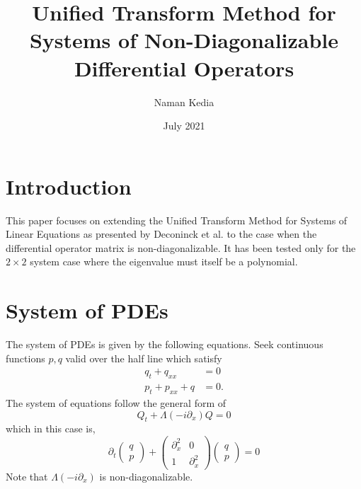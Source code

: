 \documentclass{article}
\title{Unified Transform Method for Systems of Non-Diagonalizable Differential Operators}
\author{Naman Kedia }
\date{July 2021}
\begin{document}
\maketitle

\section{Introduction}
This paper focuses on extending the Unified Transform Method for Systems of Linear Equations as presented by Deconinck et al. to the case when the differential operator matrix is non-diagonalizable. It has been tested only for the $2 \times 2$ system case where the eigenvalue must itself be a polynomial.

\section{System of PDEs}
The system of PDEs is given by the following equations.
Seek continuous functions $p, q$ valid over the half line which satisfy
\begin{align}
    q_t + q_{xx} &= 0 \label{eq:1} \\
    p_t + p_{xx} + q &= 0. \label{eq:2}
\end{align}
The system of equations follow the general form of 
\begin{equation} \label{eq:3}
    Q_t + \Lambda(-i\partial_x)Q = 0
\end{equation}
which in this case is,
\begin{equation} \label{eq:4}
    \partial_t \left(\begin{array}{cc}
        q   \\
        p
    \end{array}\right) +
    \left(\begin{array}{cc}
    \partial^2_x & 0 \\
    1     & \partial^2_x
    \end{array}\right)
    \left(\begin{array}{cc}
        q   \\
        p
    \end{array}\right)
    = 0
\end{equation}
Note that $\Lambda(-i\partial_x)$ is non-diagonalizable.
\end{document}
